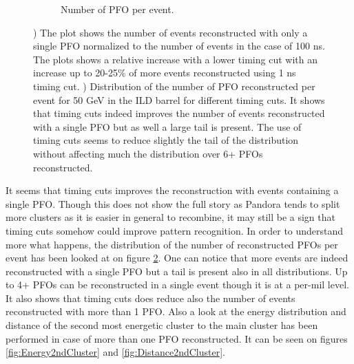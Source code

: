 \begin{figure}[htbp!]
\begin{subfigure}[t]{0.49\textwidth}
    \caption{Number of PFO per event.} \label{fig:DistriPFO}
  \end{subfigure}
  \caption{) The plot shows the number of events reconstructed with only a single PFO normalized to the number of events in the case of 100 ns. The plots shows a relative increase with a lower timing cut with an increase up to 20-25\% of more events reconstructed using 1 ns timing cut. ) Distribution of the number of PFO reconstructed per event for 50 GeV \kzeroL{} in the ILD barrel for different timing cuts. It shows that timing cuts indeed improves the number of events reconstructed with a single PFO but as well a large tail is present. The use of timing cuts seems to reduce slightly the tail of the distribution without affecting much the distribution over 6+ PFOs reconstructed.}
\end{figure}

It seems that timing cuts improves the reconstruction with events containing a single PFO. Though this does not show the full story as Pandora tends to split more clusters as it is easier in general to recombine, it may still be a sign that timing cuts somehow could improve pattern recognition. In order to understand more what happens, the distribution of the number of reconstructed PFOs per event has been looked at on figure \ref{fig:DistriPFO}. One can notice that more events are indeed reconstructed with a single PFO but a tail is present also in all distributions. Up to 4+ PFOs can be reconstructed in a single event though it is at a per-mil level. It also shows that timing cuts does reduce also the number of events reconstructed with more than 1 PFO. Also a look at the energy distribution and distance of the second most energetic cluster to the main cluster has been performed in case of more than one PFO reconstructed. It can be seen on figures \ref{fig:Energy2ndCluster} and \ref{fig:Distance2ndCluster}.

